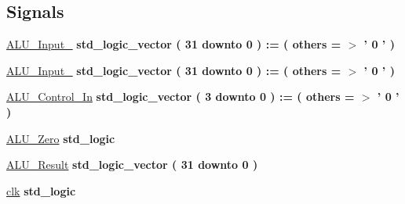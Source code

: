 \subsection*{\-Signals}
 \begin{DoxyCompactItemize}
\item 
\hyperlink{class_a_l_u__tb_1_1behavior_a8c429fd721a833d34cba27d8fe50acab}{\-A\-L\-U\-\_\-\-Input\-\_} {\bfseries std\-\_\-logic\-\_\-vector (   31    downto    0  )  \-:= (  others  = $>$ '  0  '  ) } 
\item 
\hyperlink{class_a_l_u__tb_1_1behavior_a4f7ecfcf9e81ab34edf691bc9f47ae85}{\-A\-L\-U\-\_\-\-Input\-\_} {\bfseries std\-\_\-logic\-\_\-vector (   31    downto    0  )  \-:= (  others  = $>$ '  0  '  ) } 
\item 
\hyperlink{class_a_l_u__tb_1_1behavior_a4fdf00b8a3e238ce4312f42ae5d8f8b8}{\-A\-L\-U\-\_\-\-Control\-\_\-\-In} {\bfseries std\-\_\-logic\-\_\-vector (   3    downto    0  )  \-:= (  others  = $>$ '  0  '  ) } 
\item 
\hyperlink{class_a_l_u__tb_1_1behavior_a4237c38378b6a76e30a521e27053321f}{\-A\-L\-U\-\_\-\-Zero} {\bfseries std\-\_\-logic } 
\item 
\hyperlink{class_a_l_u__tb_1_1behavior_affbe09d36e6381e4075f5f4bdf87749d}{\-A\-L\-U\-\_\-\-Result} {\bfseries std\-\_\-logic\-\_\-vector (   31    downto    0  ) } 
\item 
\hyperlink{class_a_l_u__tb_1_1behavior_acb8805c41e29b9bb490d97fed2b1f020}{clk} {\bfseries std\-\_\-logic } 
\end{DoxyCompactItemize}


